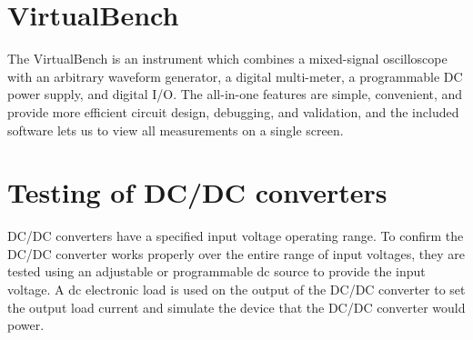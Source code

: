 \section{VirtualBench}

The VirtualBench is an instrument which combines a mixed-signal oscilloscope with an arbitrary waveform generator, a digital multi-meter, a programmable DC power supply, and digital I/O. The all-in-one features are simple, convenient, and provide more efficient circuit design, debugging, and validation, and the included software lets us to view all measurements on a single screen.

\section{Testing of DC/DC converters}
DC/DC converters have a specified input voltage operating range. To confirm the DC/DC converter works properly over the entire range of input voltages, they are tested using an adjustable or programmable dc source to provide the input voltage. A dc electronic load is used on the output of the DC/DC converter to set the output load current and simulate the device that the DC/DC converter would power.

